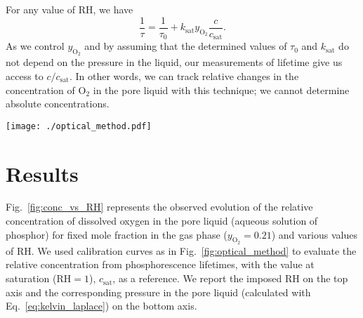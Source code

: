 \documentclass[aps,prl,twocolumn,superscriptaddress,groupedaddress]{revtex4}
\begin{document}
For any value of $\mathrm{RH}$, we have
\begin{equation}
\frac{1}{\tau} = \frac{1}{\tau_0} + k_\text{sat} y_\mathrm{O_2} \frac{c}{c_\text{sat}}.
\label{eq:stern_volmer_final}
\end{equation}
\noindent As we control $y_\mathrm{O_2}$ and by assuming that the determined values of $\tau_0$ and $k_\text{sat}$ do not depend on the pressure in the liquid, our measurements of lifetime give us access to $c/c_\text{sat}$. In other words, we can track relative changes in the concentration of $\mathrm{O_2}$ in the pore liquid with this technique; we cannot determine absolute concentrations.

\begin{figure*}[!htb]
\centering
\texttt{[image: ./optical\_method.pdf]}
\caption{Phosphorescence lifetime of dye in pore liquid. (a) Example of phosphorescence signal and exponential fit, with lifetime~$\tau=\SI{4.7}{\micro\second}$, amplitude $\Delta I=479$ and noise level $I_\infty = 135$. (b) Evolution of lifetime in Vycor with mole fraction of oxygen, $y_\mathrm{O_2}$, in saturated atmosphere. Blue dots are the measured lifetimes at different positions on the porous glass ($N=25$), red crosses represent the average lifetime and errorbars correspond to standard deviations over the sample. Black line corresponds to a linear fit~\eqref{eq:stern_volmer_gas} with~$\tau_0=\SI{8.7(3)}{\micro\second}$ and~$k_\text{sat}=\SI{0.48(2)}{\per\micro\second}$.   \label{fig:optical_method}}
\end{figure*}


\section{Results}

Fig.~\ref{fig:conc_vs_RH} represents the observed evolution of the relative concentration of dissolved oxygen in the pore liquid (aqueous solution of phosphor) for fixed mole fraction in the gas phase ($y_\mathrm{O_2}=0.21$) and various values of $\mathrm{RH}$. We used calibration curves as in Fig.~\ref{fig:optical_method} to evaluate the relative concentration from phosphorescence lifetimes, with the value at saturation ($\mathrm{RH}=1$), $c_\text{sat}$, as a reference. We report the imposed $\mathrm{RH}$ on the top axis and the corresponding pressure in the pore liquid (calculated with Eq.~\eqref{eq:kelvin_laplace}) on the bottom axis.
\end{document}
